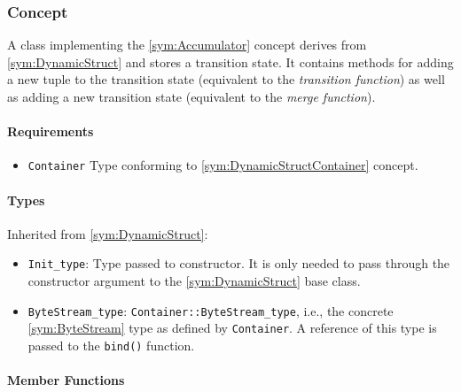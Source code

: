 \subsubsection[Concept Accumulator]{Concept }

A class implementing the \ref{sym:Accumulator} concept derives from \ref{sym:DynamicStruct} and stores a transition state. It contains methods for adding a new tuple to the transition state (equivalent to the \emph{transition function}) as well as adding a new transition state (equivalent to the \emph{merge function}).

\paragraph{Requirements}

\begin{itemize}
	\item \texttt{Container} Type conforming to \ref{sym:DynamicStructContainer} concept.
\end{itemize}

\paragraph{Types}

Inherited from \ref{sym:DynamicStruct}:
\begin{itemize}
	\item \texttt{Init\_type}: Type passed to constructor. It is only needed to pass through the constructor argument to the \ref{sym:DynamicStruct} base class.
	\item \texttt{ByteStream\_type}: \texttt{Container::ByteStream\_type}, i.e., the concrete \ref{sym:ByteStream} type as defined by \texttt{Container}. A reference of this type is passed to the \texttt{bind()} function.
\end{itemize}

\paragraph{Member Functions}

